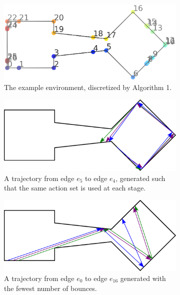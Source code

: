 \documentclass[sageh,times,Review]{sagej}
\begin{document}
\begin{figure}
\centering
\begin{subfigure}{0.8\columnwidth}
\includegraphics[width=\linewidth]{sort_inserted.eps}
\caption{The example environment, discretized by Algorithm 1. \label{fig:example_env}}
\end{subfigure}
\begin{subfigure}{0.5\columnwidth}
\includegraphics[width=\linewidth]{escape_room.eps}
\caption{A trajectory from edge $e_5$ to edge $e_4$, generated such that the same action set is used at each
stage. \label{fig:constant}}
\end{subfigure}%
\begin{subfigure}{0.5\columnwidth}
\includegraphics[width=\linewidth]{short_path.eps}
\caption{A trajectory from edge $e_0$ to edge $e_16$ generated with the fewest number of bounces.
\label{fig:short}}
\end{subfigure}
\caption{\label{fig:examples}}
\end{figure}
\end{document}
